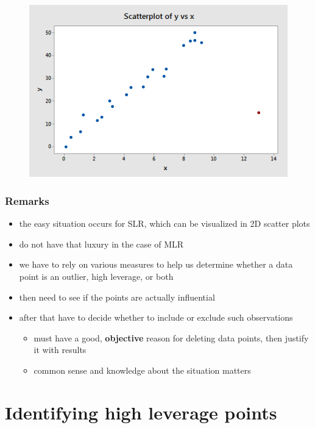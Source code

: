 \documentclass[
	11pt, %
]{beamer}
\begin{document}
\begin{frame}[allowframebreaks]
\begin{figure}
	\end{figure} 
	\begin{figure}
		\includegraphics[scale=0.8]{influ_scatter_09.png}
	\end{figure}
\end{frame}

\begin{frame}
	\frametitle{Remarks}
	\begin{itemize}
		\item the easy situation occurs for SLR, which can be visualized in 2D scatter plots
		\pause
		\item do not have that luxury in the case of MLR
		\pause
		\item we have to rely on various measures to help us determine whether a data point is an outlier, high leverage, or both
		\pause
		\item then need to see if the points are actually influential
		\pause
		\item after that have to decide whether to include or exclude such observations
		\pause
		\begin{itemize}
				\item must have a good, \textbf{objective} reason for deleting data points, then justify it with results
				\pause
				\item common sense and knowledge about the situation matters
		\end{itemize}	
	\end{itemize}
\end{frame}

\section{Identifying high leverage points}
\end{document}
